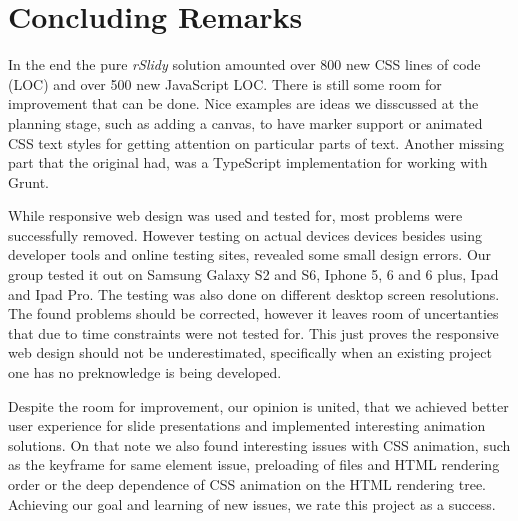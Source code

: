 %
%
% 
% 
% 


\chapter{Concluding Remarks}

\label{chap:Concl}

In the end the pure \textit{rSlidy} solution amounted over 800 new CSS lines of 
code (LOC) and over 500 new
JavaScript LOC. There is still some room for improvement that can be done. Nice 
examples are ideas we disscussed at the planning stage, such as adding a 
canvas, to have marker support or animated CSS text styles for getting 
attention on particular parts of text. Another missing part that the original 
had, was a TypeScript implementation for working with Grunt.

While responsive web design was used and tested for, most problems were 
successfully removed. However testing on actual devices devices besides using 
developer tools and online testing sites, revealed some small design errors. 
Our group tested it out on Samsung Galaxy S2 and S6, Iphone 5, 6 and 6 plus, 
Ipad and Ipad Pro. The testing was also done on different desktop screen 
resolutions. The found problems should be corrected, however it leaves room of 
uncertanties that due to time constraints were not tested for. This just proves 
the responsive web design should not be underestimated, specifically when an 
existing project one has no preknowledge is being developed.


 Despite the room for improvement, our opinion is united, that we achieved 
better user experience for slide presentations and implemented interesting 
animation solutions. On that note we also found interesting issues with CSS 
animation, such as the keyframe for same element issue, preloading of files and 
HTML rendering order or the deep dependence of CSS animation on the HTML 
rendering tree. Achieving our goal and learning of new issues, we rate this 
project as a success.